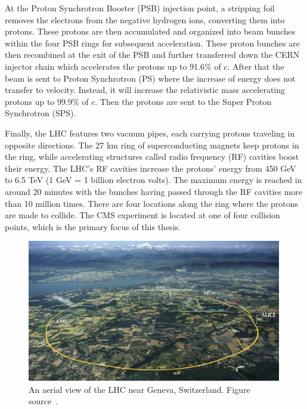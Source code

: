 At the Proton Synchrotron Booster (PSB) injection point, a stripping foil removes the electrons from the negative hydrogen ions, converting them into protons. These protons are then accumulated and organized into beam bunches within the four PSB rings for subsequent acceleration.
These proton bunches are then recombined at the exit of the PSB and further transferred down the CERN injector chain which accelerates the protons up to 91.6\% of $c$.
After that the beam is sent to Proton Synchrotron (PS) where the increase of energy does not transfer to velocity.
Instead, it will increase the relativistic mass accelerating protons up to 99.9\% of $c$. Then the protons are sent to the Super Proton Synchrotron (SPS).

Finally, the LHC features two vacuum pipes, each carrying protons traveling in opposite directions.
The 27 km ring of superconducting magnets keep protons in the ring,
while accelerating structures called radio frequency (RF) cavities boost their energy.
The LHC's RF cavities increase the protons' energy from 450 GeV to 6.5 TeV (1 GeV = 1 billion electron volts).
The maximum energy is reached in around 20 minutes with the bunches having passed through the RF cavities more than 10 million times.
There are four locations along the ring where the protons are made to collide.
The CMS experiment is located at one of four collision points, which is the primary focus of this thesis.

\begin{figure}[t!]
\centering
\includegraphics[width=0.99\textwidth]{figures/LHC_location.png}
\caption[A view of the LHC]{An aerial view of the LHC near Geneva, Switzerland. Figure source~\cite{LHC_location}.}
\label{fig:LHC_location}
\end{figure}

